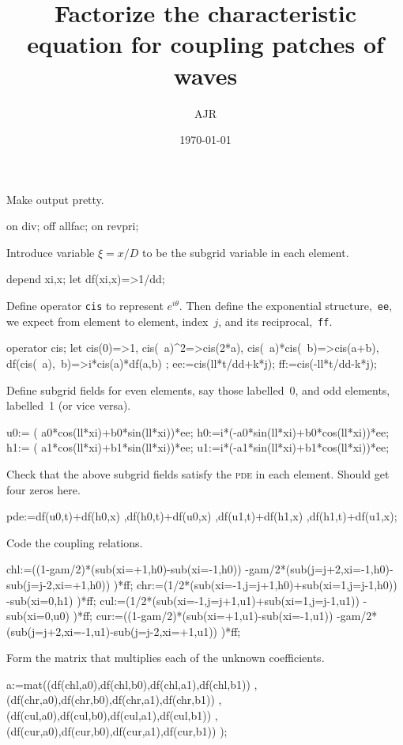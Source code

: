 \documentclass[12pt,a5paper]{article}
\title{Factorize the characteristic equation for coupling patches of waves}
\author{AJR}
\date{\today}
\begin{document}
\maketitle

Make output pretty.
\begin{reduce}
on div; off allfac; on revpri;
\end{reduce}

Introduce variable $\xi=x/D$ to be the subgrid variable in each element.
\begin{reduce}
depend xi,x; let df(xi,x)=>1/dd;
\end{reduce}

Define operator \verb|cis| to represent $e^{i\theta}$.  Then define the exponential structure,~\verb|ee|, we expect from element to element, index~$j$, and its reciprocal,~\verb|ff|.
\begin{reduce}
operator cis; 
let {cis(0)=>1, cis(~a)^2=>cis(2*a),
     cis(~a)*cis(~b)=>cis(a+b),
     df(cis(~a),~b)=>i*cis(a)*df(a,b)
     };
ee:=cis(ll*t/dd+k*j);
ff:=cis(-ll*t/dd-k*j);
\end{reduce}

Define subgrid fields for even elements, say those labelled~0, and odd elements, labelled~1 (or vice versa). 
\begin{reduce}
u0:=  ( a0*cos(ll*xi)+b0*sin(ll*xi))*ee;
h0:=i*(-a0*sin(ll*xi)+b0*cos(ll*xi))*ee;
h1:=  ( a1*cos(ll*xi)+b1*sin(ll*xi))*ee;
u1:=i*(-a1*sin(ll*xi)+b1*cos(ll*xi))*ee;
\end{reduce}

Check that the above subgrid fields satisfy the \textsc{pde} in each element.  Should get four zeros here.
\begin{reduce}
pde:={df(u0,t)+df(h0,x)
     ,df(h0,t)+df(u0,x)
     ,df(u1,t)+df(h1,x)
     ,df(h1,t)+df(u1,x)};
\end{reduce}

Code the coupling relations.
\begin{reduce}
chl:=((1-gam/2)*(sub(xi=+1,h0)-sub(xi=-1,h0))
    -gam/2*(sub({j=j+2,xi=-1},h0)-sub({j=j-2,xi=+1},h0))
    )*ff;
chr:=(1/2*(sub({xi=-1,j=j+1},h0)+sub({xi=1,j=j-1},h0))
    -sub(xi=0,h1)
    )*ff;
cul:=(1/2*(sub({xi=-1,j=j+1},u1)+sub({xi=1,j=j-1},u1))
    -sub(xi=0,u0)
    )*ff;
cur:=((1-gam/2)*(sub(xi=+1,u1)-sub(xi=-1,u1))
    -gam/2*(sub({j=j+2,xi=-1},u1)-sub({j=j-2,xi=+1},u1))
    )*ff;
\end{reduce}

Form the matrix that multiplies each of the unknown coefficients.
\begin{reduce}
a:=mat((df(chl,a0),df(chl,b0),df(chl,a1),df(chl,b1))
      ,(df(chr,a0),df(chr,b0),df(chr,a1),df(chr,b1))
      ,(df(cul,a0),df(cul,b0),df(cul,a1),df(cul,b1))
      ,(df(cur,a0),df(cur,b0),df(cur,a1),df(cur,b1))
      );
\end{reduce}
\end{document}
